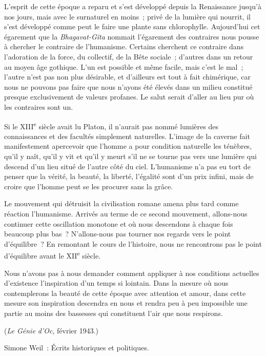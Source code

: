 \documentclass[french,twoside]{book} %
\begin{document}
\par
L'esprit de cette époque a reparu et s'est développé depuis la Renaissance jusqu'à nos jours, mais avec le surnaturel en moins ; privé de la lumière qui nourrit, il s'est développé comme peut le faire une plante sans chlorophylle. Aujourd'hui cet égarement que la {\itshape Bhagavat-Gîta} nommait l'égarement des contraires nous pousse à chercher le contraire de l'humanisme. Certains cher­chent ce contraire dans l'adoration de la force, du collectif, de la Bête sociale ; d'autres dans un retour au moyen âge gothique. L'un est possible et même facile, mais c'est le mal ; l'autre n'est pas non plus désirable, et d'ailleurs est tout à fait chimérique, car nous ne pouvons pas faire que nous n'ayons été élevés dans un milieu constitué presque exclusivement de valeurs profanes. Le salut serait d'aller au lieu pur où les contraires sont un.\par
Si le XIII\textsuperscript{e} siècle avait lu Platon, il n'aurait pas nommé lumières des connaissances et des facultés simplement naturelles. L'image de la caverne fait manifestement apercevoir que l'homme a pour condition naturelle les ténèbres, qu'il y naît, qu'il y vit et qu'il y meurt s'il ne se tourne pas vers une lumière qui descend d'un lieu situé de l'autre côté du ciel. L'humanisme n'a pas eu tort de penser que la vérité, la beauté, la liberté, l'égalité sont d'un prix infini, mais de croire que l'homme peut se les procurer sans la grâce.\par
Le mouvement qui détruisit la civilisation romane amena plus tard comme réaction l'humanisme. Arrivés au terme de ce second mouvement, allons-nous continuer cette oscillation monotone et où nous descendons à chaque fois beaucoup plus bas ? N'allons-nous pas tourner nos regards vers le point d'équilibre ? En remontant le cours de l'histoire, nous ne rencontrons pas le point d'équilibre avant le XII\textsuperscript{e} siècle.\par
Nous n'avons pas à nous demander comment appliquer à nos conditions actuelles d'existence l'inspiration d'un temps si lointain. Dans la mesure où nous contemplerons la beauté de cette époque avec attention et amour, dans cette mesure son inspiration descendra en nous et rendra peu à peu impossible une partie au moins des bassesses qui constituent l'air que nous respirons.\par
({\itshape Le Génie d'Oc}, février 1943.)\par

\begin{center}
\noindent \centerline{Simone Weil : Écrits historiques et politiques.}\par
\end{center}
\end{document}
